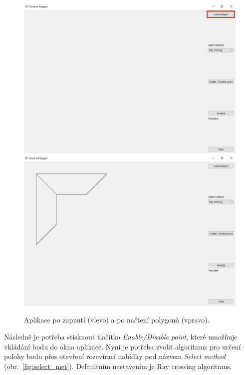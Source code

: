 \documentclass[a4paper, 12pt, oneside, titlepage]{article} %
\begin{document}
\begin{figure}[htbh]
	\centering
	\includegraphics[scale=0.285]{obrazky/app_zapnuti.png}
	\includegraphics[scale=0.285]{obrazky/app_pol.png} 
	\caption{Aplikace po zapnutí (vlevo) a po načtení polygonů (vpravo).
	}
	\label{fig:app_zap_pol}
\end{figure} 
\FloatBarrier

Následně je potřeba stisknout tlačítko \emph{Enable/Disable point}, které umožňuje vkládání bodu do okna aplikace. Nyní je potřeba zvolit algoritmus pro určení polohy bodu přes otevření rozevírací nabídky pod názvem \emph{Select method} (obr.~\ref{fig:select_met}). Defaultním nastavením je Ray crossing algoritmus.
\end{document}
